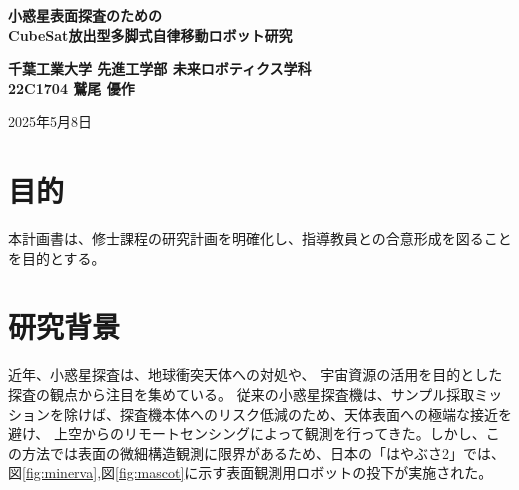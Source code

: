\documentclass[dvipdfmx,titlepage,a4j]{jsarticle}
\author{waarrk}
\date{2023年2月1日}
\begin{document}
\begin{titlepage}
    \centering
    \vspace*{2cm}

    \vspace{5cm}

    {\LARGE \textbf{小惑星表面探査のための\\CubeSat放出型多脚式自律移動ロボット研究}}

    \vspace{0.5cm}

    {\textbf{千葉工業大学 先進工学部 未来ロボティクス学科}\\}
    {\textbf{22C1704 鷲尾 優作}}

    \vfill

    {\large 2025年5月8日}

    \vspace{1cm}
\end{titlepage}

\newpage

\section{目的}
本計画書は、修士課程の研究計画を明確化し、指導教員との合意形成を図ることを目的とする。

\section{研究背景}
近年、小惑星探査は、地球衝突天体への対処や、
宇宙資源の活用を目的とした探査の観点から注目を集めている。
従来の小惑星探査機は、サンプル採取ミッションを除けば、探査機本体へのリスク低減のため、天体表面への極端な接近を避け、
上空からのリモートセンシングによって観測を行ってきた。しかし、この方法では表面の微細構造観測に限界があるため、日本の「はやぶさ2」では、図\ref{fig:minerva},図\ref{fig:mascot}に示す表面観測用ロボットの投下が実施された。
\end{document}
